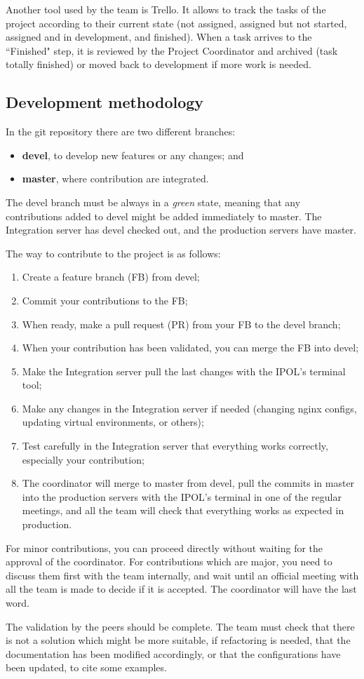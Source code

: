 Another tool used by the team is Trello. It allows to track the tasks of the project according to their current state (not assigned, assigned but not started, assigned and in development, and finished). When a task arrives to the ``Finished" step, it is reviewed by the Project Coordinator and archived (task totally finished) or moved back to development if more work is needed.

\subsection{Development methodology}
In the git repository there are two different branches:
\begin{itemize}
	\item \textbf{devel}, to develop new features or any changes; and
	\item \textbf{master}, where contribution are integrated.
\end{itemize}

The devel branch must be always in a \emph{green} state, meaning that any contributions added to devel might be added immediately to master. The Integration server has devel checked out, and the production servers have master.

The way to contribute to the project is as follows:
\begin{enumerate}
	\item Create a feature branch (FB) from devel;
	\item Commit your contributions to the FB;
	\item When ready, make a pull request (PR) from your FB to the devel branch;
	\item When your contribution has been validated, you can merge the FB into devel;
	\item Make the Integration server pull the last changes with the IPOL's terminal tool;
	\item Make any changes in the Integration server if needed (changing nginx configs, updating virtual environments, or others);
	\item Test carefully in the Integration server that everything works correctly, especially your contribution;
	\item The coordinator will merge to master from devel, pull the commits in master into the production servers with the IPOL's terminal in one of the regular meetings, and all the team will check that everything works as expected in production.
\end{enumerate}

For minor contributions, you can proceed directly without waiting for the approval of the coordinator.
For contributions which are major, you need to discuss them first with the team internally, and wait until an official meeting with all the team is made to decide if it is accepted. The coordinator will have the last word.

The validation by the peers should be complete. The team must check that there is not a solution which might be more suitable, if refactoring is needed, that the documentation has been modified accordingly, or that the configurations have been updated, to cite some examples.
